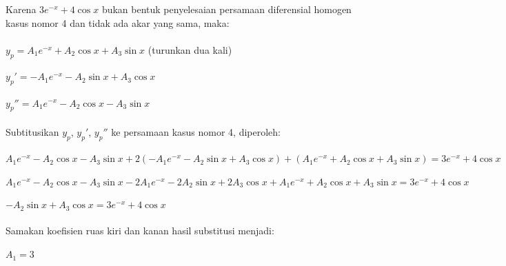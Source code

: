 \begin{enumerate}[1.]
	Karena \begin{math} 3e^{-x} + 4 \cos x \end{math} bukan bentuk penyelesaian persamaan diferensial homogen kasus nomor 4 dan tidak ada akar yang sama, maka:  \\ \\
	\begin{math} y_p = A_1 e^{-x} + A_2 \cos x + A_3 \sin x \end{math} (turunkan dua kali) \\ \\
	\begin{math} y_p' =  -A_1 e^{-x} - A_2 \sin x + A_3 \cos x \end{math} \\ \\
	\begin{math} y_p'' = A_1 e^{-x} - A_2 \cos x - A_3 \sin x \end{math} \\ \\
	Subtitusikan \begin{math} y_p \end{math}, \begin{math} y_p' \end{math}, \begin{math} y_ p'' \end{math} ke persamaan kasus nomor 4, diperoleh: \\ \\
	\begin{math} A_1 e^{-x} - A_2 \cos x - A_3 \sin x + 2(-A_1 e^{-x} - A_2 \sin x + A_3 \cos x) + (A_1 e^{-x} + A_2 \cos x + A_3 \sin x) = 3e^{-x} + 4 \cos x \end{math} \\ \\
	\begin{math} A_1 e^{-x} - A_2 \cos x - A_3 \sin x -2 A_1 e^{-x} - 2 A_2 \sin x + 2 A_3 \cos x + A_1 e^{-x} + A_2 \cos x + A_3 \sin x = 3e^{-x} + 4 \cos x \end{math} \\ \\
	\begin{math} - A_2 \sin x + A_3 \cos x = 3e^{-x} + 4 \cos x \end{math} \\ \\
	Samakan koefisien ruas kiri dan kanan hasil substitusi menjadi: \\ \\
	\begin{math} A_1 = 3 \end{math} \\ \\

\end{enumerate}
